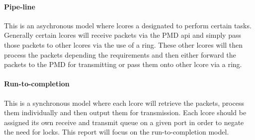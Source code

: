 \documentclass[final_report.tex]{subfiles}
\begin{document}
\paragraph*{Pipe-line}
This is an asychronous model where lcores a designated to perform certain tasks. Generally certain lcores will receive packets via the PMD api and simply pass those packets to other lcores via the use of a ring. These other lcores will then process the packets depending the requirements and then either forward the packets to the PMD for transmitting or pass them onto other lcore via a ring.

\paragraph*{Run-to-completion}
This is a synchronous model where each lcore will retrieve the packets, process them individually and then output them for transmission. Each lcore should be assigned its own receive and transmit queue on a given port in order to negate the need for locks. This report will focus on the run-to-completion model.
\end{document}

